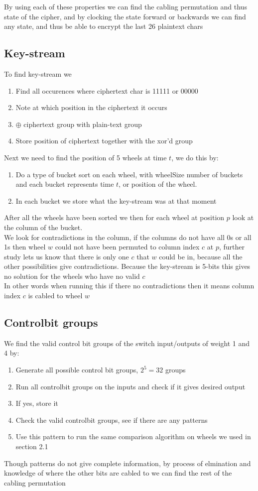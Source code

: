 \documentclass{article}
\begin{document}
By using each of these properties we can find the cabling permutation and thus state of the cipher, and by clocking the state forward or backwards we can find any state, and thus be able to encrypt the last 26 plaintext chars

\subsection{Key-stream}

To find key-stream we
\begin{enumerate}
	\item Find all occurences where ciphertext char is 11111 or 00000
	\item Note at which position in the ciphertext it occurs
	\item $\oplus$ ciphertext group with plain-text group
	\item Store position of ciphertext together with the xor'd group
\end{enumerate}

Next we need to find the position of 5 wheels at time $t$, we do this by:
\begin{enumerate}
	\item Do a type of bucket sort on each wheel, with wheelSize number of buckets and each bucket represents time $t$, or position of the wheel.
	\item In each bucket we store what the key-stream was at that moment
\end{enumerate}

After all the wheels have been sorted we then for each wheel at position $p$ look at the column of the bucket.\\
We look for contradictions in the column, if the columns do not have all 0s or all 1s then wheel $w$ could not have been permuted to column index $c$ at $p$, further study lets us know that there is only one $c$ that $w$ could be in, because all the other possibilities give contradictions. Because the key-stream is 5-bits this gives no solution for the wheels who have no valid $c$\\
In other words when running this if there no contradictions then it means column index $c$ is cabled to wheel $w$

\subsection{Controlbit groups}

We find the valid control bit groups of the switch input/outputs of weight 1 and 4 by:
\begin{enumerate}
	\item Generate all possible control bit groups, $2^{5} = 32$ groups
	\item Run all controlbit groups on the inputs and check if it gives desired output
	\item If yes, store it
	\item Check the valid controlbit groups, see if there are any patterns
	\item Use this pattern to run the same comparison algorithm on wheels we used in section 2.1
\end{enumerate}

Though patterns do not give complete information, by process of elmination and knowledge of where the other bits are cabled to we can find the rest of the cabling permutation
\end{document}

